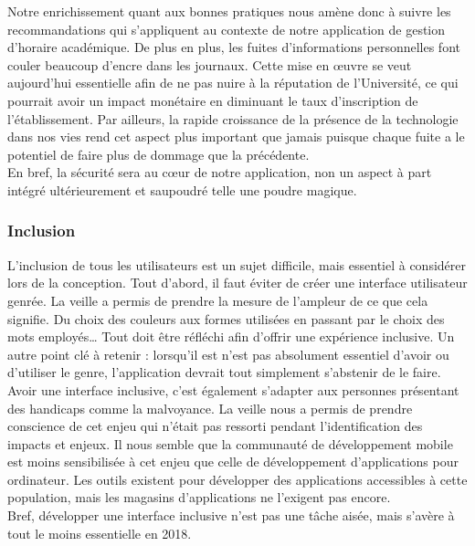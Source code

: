 		Notre enrichissement quant aux bonnes pratiques nous amène donc à suivre les recommandations qui s'appliquent au contexte de notre application de gestion d'horaire académique. De plus en plus, les fuites d'informations personnelles font couler beaucoup d'encre dans les journaux. Cette mise en \oe uvre se veut aujourd'hui essentielle afin de ne pas nuire à la réputation de l'Université, ce qui pourrait avoir un impact monétaire en diminuant le taux d'inscription de l'établissement. Par ailleurs, la rapide croissance de la présence de la technologie dans nos vies rend cet aspect plus important que jamais puisque chaque fuite a le potentiel de faire plus de dommage que la précédente. \\
		
		En bref, la sécurité sera au c\oe ur de notre application, non un aspect à part intégré ultérieurement et saupoudré telle une poudre magique. 
		
		\pagebreak
		\subsubsection{Inclusion}
		L'inclusion de tous les utilisateurs est un sujet difficile, mais essentiel à considérer lors de la conception. Tout d'abord, il faut éviter de créer une interface utilisateur genrée. La veille a permis de prendre la mesure de l'ampleur de ce que cela signifie. Du choix des couleurs aux formes utilisées en passant par le choix des mots employés\dots{} Tout doit être réfléchi afin d'offrir une expérience inclusive. Un autre point clé à retenir : lorsqu'il est n'est pas absolument essentiel d'avoir ou d'utiliser le genre, l'application devrait tout simplement s'abstenir de le faire. \\
		
		Avoir une interface inclusive, c'est également s'adapter aux personnes présentant des handicaps comme la malvoyance. La veille nous a permis de prendre conscience de cet enjeu qui n'était pas ressorti pendant l'identification des impacts et enjeux. Il nous semble que la communauté de développement mobile est moins sensibilisée à cet enjeu que celle de développement d'applications pour ordinateur. Les outils existent pour développer des applications accessibles à cette population, mais les magasins d'applications ne l'exigent pas encore. \\
		
		Bref, développer une interface inclusive n'est pas une tâche aisée, mais s'avère à tout le moins essentielle en 2018.
		
